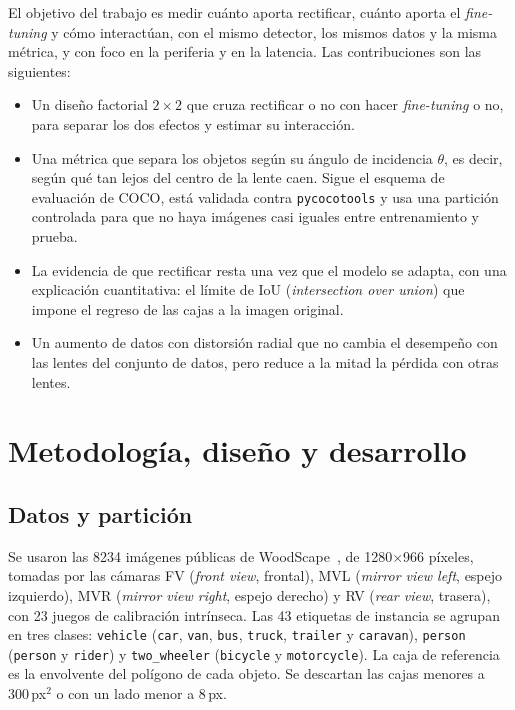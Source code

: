 \documentclass[conference]{IEEEtran}
\begin{document}
El objetivo del trabajo es medir cuánto aporta rectificar, cuánto aporta el \textit{fine-tuning} y cómo interactúan, con el mismo detector, los mismos datos y la misma métrica, y con foco en la periferia y en la latencia. Las contribuciones son las siguientes:
\begin{itemize}
\item Un diseño factorial $2\times2$ que cruza rectificar o no con hacer \textit{fine-tuning} o no, para separar los dos efectos y estimar su interacción.
\item Una métrica que separa los objetos según su ángulo de incidencia $\theta$, es decir, según qué tan lejos del centro de la lente caen. Sigue el esquema de evaluación de COCO, está validada contra \texttt{pycocotools} y usa una partición controlada para que no haya imágenes casi iguales entre entrenamiento y prueba.
\item La evidencia de que rectificar resta una vez que el modelo se adapta, con una explicación cuantitativa: el límite de IoU (\textit{intersection over union}) que impone el regreso de las cajas a la imagen original.
\item Un aumento de datos con distorsión radial que no cambia el desempeño con las lentes del conjunto de datos, pero reduce a la mitad la pérdida con otras lentes.
\end{itemize}

\section{Metodología, diseño y desarrollo}

\subsection{Datos y partición}
Se usaron las 8234 imágenes públicas de WoodScape~\cite{yogamani2019woodscape}, de 1280$\times$966 píxeles, tomadas por las cámaras FV (\textit{front view}, frontal), MVL (\textit{mirror view left}, espejo izquierdo), MVR (\textit{mirror view right}, espejo derecho) y RV (\textit{rear view}, trasera), con 23 juegos de calibración intrínseca. Las 43 etiquetas de instancia se agrupan en tres clases: \texttt{vehicle} (\texttt{car}, \texttt{van}, \texttt{bus}, \texttt{truck}, \texttt{trailer} y \texttt{caravan}), \texttt{person} (\texttt{person} y \texttt{rider}) y \texttt{two\_wheeler} (\texttt{bicycle} y \texttt{motorcycle}). La caja de referencia es la envolvente del polígono de cada objeto. Se descartan las cajas menores a 300\,px$^2$ o con un lado menor a 8\,px.
\end{document}
